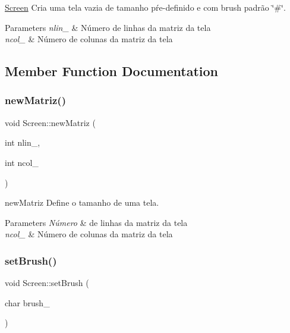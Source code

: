 \hyperlink{class_screen}{Screen} Cria uma tela vazia de tamanho pŕe-\/definido e com brush padrão \char`\"{}\#\char`\"{}. 


\begin{DoxyParams}{Parameters}
{\em nlin\+\_\+} & Número de linhas da matriz da tela \\
\hline
{\em ncol\+\_\+} & Número de colunas da matriz da tela \\
\hline
\end{DoxyParams}


\subsection{Member Function Documentation}
\mbox{\label{class_screen_a12eef567d26f6cb00981da6384be2eac}} 
\subsubsection{\texorpdfstring{new\+Matriz()}{newMatriz()}}
{\footnotesize\ttfamily void Screen\+::new\+Matriz (\begin{DoxyParamCaption}\item[{int}]{nlin\+\_\+,  }\item[{int}]{ncol\+\_\+ }\end{DoxyParamCaption})}



new\+Matriz Define o tamanho de uma tela. 


\begin{DoxyParams}{Parameters}
{\em Número} & de linhas da matriz da tela \\
\hline
{\em ncol\+\_\+} & Número de colunas da matriz da tela \\
\hline
\end{DoxyParams}
\mbox{\label{class_screen_a01312ae6a1168ec0a02c24877059571f}} 
\subsubsection{\texorpdfstring{set\+Brush()}{setBrush()}}
{\footnotesize\ttfamily void Screen\+::set\+Brush (\begin{DoxyParamCaption}\item[{char}]{brush\+\_\+ }\end{DoxyParamCaption})}



